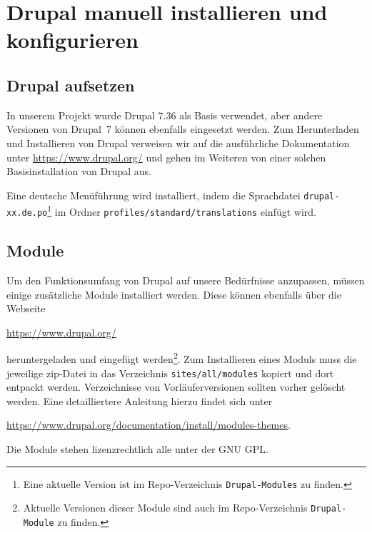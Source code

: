 \documentclass[a4paper,11pt,twoside]{article}
\begin{document}
\section{Drupal manuell installieren und konfigurieren}

\subsection{Drupal aufsetzen}

In unserem Projekt wurde Drupal 7.36 als Basis verwendet, aber andere Versionen
von Drupal~7 können ebenfalls eingesetzt werden.  Zum Herunterladen und
Installieren von Drupal verweisen wir auf die ausführliche Dokumentation unter
\url{https://www.drupal.org/} und gehen im Weiteren von einer solchen
Basisinstallation von Drupal aus.

Eine deutsche Menüführung wird installiert, indem die Sprachdatei
\texttt{drupal-xx.de.po}\footnote{Eine aktuelle Version ist im
  Repo-Verzeichnis \texttt{Drupal-Modules} zu finden.} im Ordner
\texttt{profiles/standard/translations} einfügt wird.

\subsection{Module}
Um den Funktionsumfang von Drupal auf unsere Bedürfnisse anzupassen, müssen
einige zusätzliche Module installiert werden. Diese können ebenfalls über die
Webseite 
\begin{center}
  \url{https://www.drupal.org/}
\end{center}
heruntergeladen und eingefügt werden\footnote{Aktuelle Versionen dieser Module
  sind auch im Repo-Verzeichnis \texttt{Drupal-Module} zu finden.}.  Zum
Installieren eines Moduls muss die jeweilige zip-Datei in das Verzeichnis
\texttt{sites/all/modules} kopiert und dort entpackt werden.  Verzeichnisse
von Vorläuferversionen sollten vorher gelöscht werden.  Eine detailliertere
Anleitung hierzu findet sich unter
\begin{center}
  \url{https://www.drupal.org/documentation/install/modules-themes}.
\end{center}
Die Module stehen lizenzrechtlich alle unter der GNU GPL.
\end{document}
